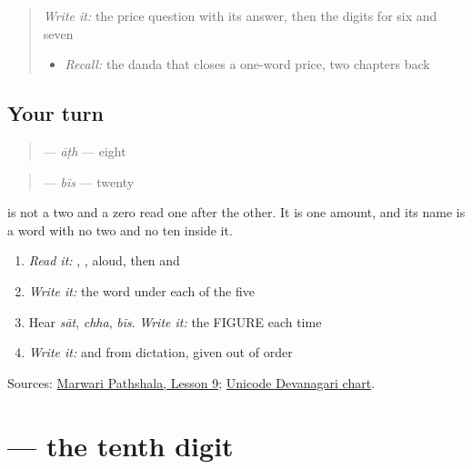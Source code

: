 \label{lesson:MW-C35-read-eight-ticket}



\begin{quote}
\emph{Write it:} the price question with its answer, then the digits for six and seven

\begin{itemize}
\raggedright
  \item \emph{Recall:} the danda that closes a one-word price, two chapters back
\end{itemize}
\end{quote}

\subsection*{Your turn}
\begin{quote}
\textbf{} — \emph{āṭh} — eight
\end{quote}

\begin{quote}
\textbf{} — \emph{bīs} — twenty
\end{quote}

\textbf{} is not a two and a zero read one after the other. It is one amount, and its name is a word with no two and no ten inside it.

\begin{enumerate}
\raggedright
  \item \emph{Read it:} \textbf{}, \textbf{}, \textbf{} aloud, then \textbf{} and \textbf{}
  \item \emph{Write it:} the word under each of the five
  \item Hear \emph{sāt}, \emph{chha}, \emph{bīs}. \emph{Write it:} the FIGURE each time
  \item \emph{Write it:} \textbf{} and \textbf{} from dictation, given out of order
\end{enumerate}

\begin{tcolorbox}[breakable,colback=teal!4,colframe=teal!35!black,title={Before you move on}]
Sources: \href{https://www.marwaripathshala.com/marwari-lesson-9-english}{Marwari Pathshala, Lesson 9}; \href{https://www.unicode.org/charts/PDF/U0900.pdf}{Unicode Devanagari chart}.
\end{tcolorbox}
\section[\texorpdfstring{\mw{९} (9)}{९ (9)}]{ — the tenth digit}

